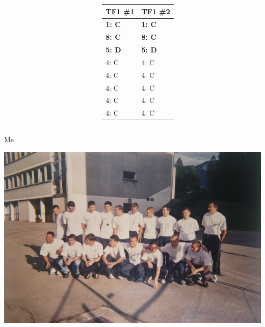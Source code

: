 \documentclass{beamer}
\newcommand{\researchfolder}{$HOME/rsc/axelrod-moran}
\begin{document}
\begin{frame}
    \begin{columns}
        \begin{column}{.6\textwidth}
            \begin{center}
                \scalebox{.49}{
                    
                }
            \end{center}
        \end{column}

        \begin{column}{.4\textwidth}
            \small
            \begin{tabular}{ll}
                \toprule
                TF1 \#1   & TF1 \#2\\
                \midrule
                \bf{1}: C & \bf{1}: C  \\
                \bf{8}: C & \bf{8}: C  \\
                \bf{5}: D & \bf{5}: D  \\
                4: C      & 4: C  \\
                4: C      & 4: C  \\
                4: C      & 4: C  \\
                4: C      & 4: C  \\
                4: C      & 4: C  \\
                \bottomrule
            \end{tabular}
        \end{column}
    \end{columns}
\end{frame}

\begin{frame}
    \begin{center}
        \Huge Me
    \end{center}
\end{frame}

\begin{frame}
    \begin{center}
        \includegraphics[width=.8\textwidth]{assets/high-school.jpg}
    \end{center}
\end{frame}
\end{document}

